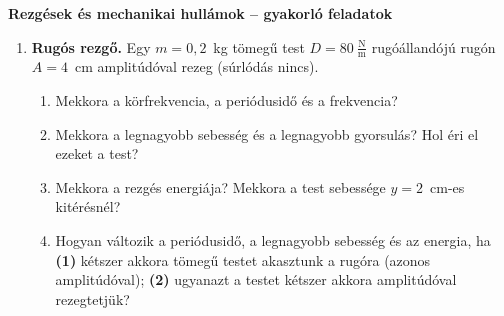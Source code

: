 \documentclass[12pt]{article}
\begin{document}
\begin{center}\vspace*{-0.4cm}
  {\Large\bfseries Rezgések és mechanikai hullámok -- gyakorló feladatok}\\[4pt]
\end{center}

\begin{enumerate}
\item \textbf{Rugós rezgő.} Egy $m = 0{,}2$~kg tömegű test $D = 80~\tfrac{\text{N}}{\text{m}}$
  rugóállandójú rugón $A = 4$~cm amplitúdóval rezeg (súrlódás nincs).
  \begin{enumerate}
    \item Mekkora a körfrekvencia, a periódusidő és a frekvencia?
    \item Mekkora a legnagyobb sebesség és a legnagyobb gyorsulás? Hol éri el ezeket a test?
    \item Mekkora a rezgés energiája? Mekkora a test sebessége $y = 2$~cm-es kitérésnél?
    \item Hogyan változik a periódusidő, a legnagyobb sebesség és az energia, ha
      \textbf{(1)} kétszer akkora tömegű testet akasztunk a rugóra (azonos amplitúdóval);
      \textbf{(2)} ugyanazt a testet kétszer akkora amplitúdóval rezegtetjük?
  \end{enumerate}
\end{enumerate}
\end{document}
